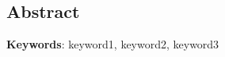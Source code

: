 %
\noindent \begin{center}
\section*{Abstract}
\par\end{center}

\lipsum[1-2]

\vspace{0.5cm}
\begin{flushleft}
\textbf{Keywords}: keyword1, keyword2, keyword3
\end{flushleft}
